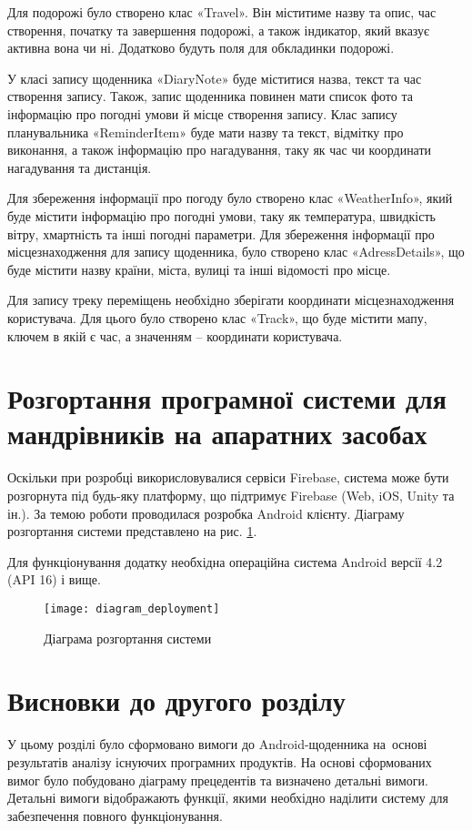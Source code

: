 \documentclass[../main.tex]{subfiles}
\begin{document}
Для подорожі було створено клас «Travel». Він міститиме назву та опис, час створення, початку та завершення подорожі, а також індикатор, який вказує активна вона чи ні. Додатково будуть поля для обкладинки подорожі.

У класі запису щоденника «DiaryNote» буде міститися назва, текст та час створення запису. Також, запис щоденника повинен мати список фото та інформацію про погодні умови й місце створення запису. Клас запису планувальника «ReminderItem» буде мати назву та текст, відмітку про виконання, а також інформацію про нагадування, таку як час чи координати нагадування та дистанція.

Для збереження інформації про погоду було створено клас «WeatherInfo», який буде містити інформацію про погодні умови, таку як температура, швидкість вітру, хмартність та інші погодні параметри. Для збереження інформації про місцезнаходження для запису щоденника, було створено клас «AdressDetails», що буде містити назву країни, міста, вулиці та інші відомості про місце.

Для запису треку переміщень необхідно зберігати координати місцезнаходження користувача. Для цього було створено клас «Track», що буде містити мапу, ключем в якій є час, а значенням -- координати користувача.

\section{Розгортання програмної системи для мандрівників на апаратних засобах}
Оскільки при розробці викорисловувалися сервіси Firebase, система може бути розгорнута під будь-яку платформу, що підтримує Firebase (Web, iOS, Unity та ін.). За темою роботи проводилася розробка Android клієнту. Діаграму розгортання системи представлено на рис. \ref{diagram:deployment}.

Для функціонування додатку необхідна операційна система Android версії 4.2 (API 16) і вище.

\begin{figure}[H]
	\centering
	\texttt{[image: diagram\_deployment]}
	\caption{Діаграма розгортання системи}
	\label{diagram:deployment}
\end{figure}

\section{Висновки до другого розділу}

У цьому розділі було сформовано вимоги до Android-щоденника на~основі результатів аналізу існуючих програмних продуктів. На основі сформованих вимог було побудовано діаграму прецедентів та визначено  детальні вимоги. Детальні вимоги відображають функції, якими необхідно наділити систему для забезпечення повного функціонування.
\end{document}
